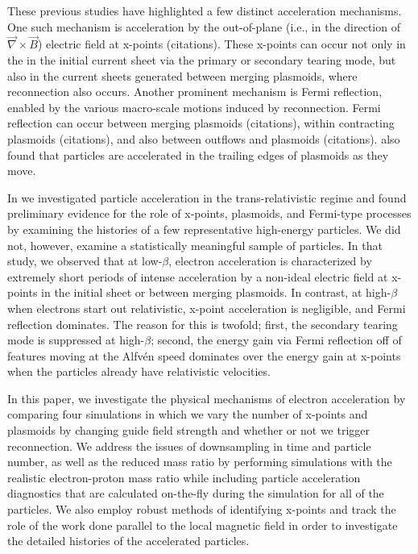 \documentclass[iop,twocolappendix]{emulateapj}
\begin{document}
These previous studies have highlighted a few distinct acceleration mechanisms.  One such mechanism is acceleration by the out-of-plane (i.e., in the direction of $\vec{\nabla} \times \vec{B}$) electric field at x-points (citations).  These x-points can occur not only in the in the initial current sheet via the primary or secondary tearing mode, but also in the current sheets generated between merging plasmoids, where reconnection also occurs.  Another prominent mechanism is Fermi reflection, enabled by the various macro-scale motions induced by reconnection.  Fermi reflection can occur between merging plasmoids (citations), within contracting plasmoids (citations), and also between outflows and plasmoids (citations).  \citet{nalewajko2015} also found that particles are accelerated in the trailing edges of plasmoids as they move.

In \citet{ball2018} we investigated particle acceleration in the trans-relativistic regime and found preliminary evidence for the role of x-points, plasmoids, and Fermi-type processes by examining the histories of a few representative high-energy particles.  We did not, however, examine a statistically meaningful sample of particles.  In that study, we observed that at low-$\beta$, electron acceleration is characterized by extremely short periods of intense acceleration by a non-ideal electric field at x-points in the initial sheet or between merging plasmoids.  In contrast, at high-$\beta$ when electrons start out relativistic, x-point acceleration is negligible, and Fermi reflection dominates.  The reason for this is twofold; first, the secondary tearing mode is suppressed at high-$\beta$; second, the energy gain via Fermi reflection off of features moving at the Alfv\'en speed dominates over the energy gain at x-points when the particles already have relativistic velocities.

In this paper, we investigate the physical mechanisms of electron acceleration by comparing four simulations in which we vary the number of x-points and plasmoids by changing guide field strength and whether or not we trigger reconnection.  We address the issues of downsampling in time and particle number, as well as the reduced mass ratio by performing simulations with the realistic electron-proton mass ratio while including particle acceleration diagnostics that are calculated on-the-fly during the simulation for all of the particles.  We also employ robust methods of identifying x-points and track the role of the work done parallel to the local magnetic field in order to investigate the detailed histories of the accelerated particles.  
\end{document}
